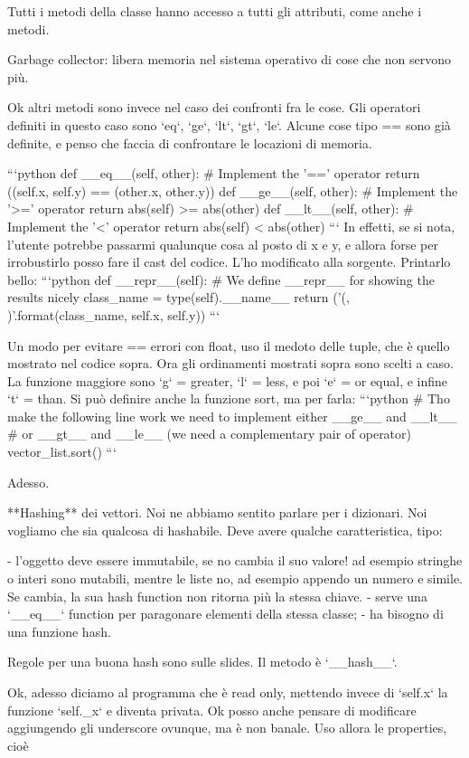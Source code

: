 \documentclass[10pt, a4paper, twosided, titlepage, draft]{book}
\begin{document}
Tutti i metodi della classe hanno accesso a tutti gli attributi, come anche i metodi.

Garbage collector: libera memoria nel sistema operativo di cose che non servono più.

Ok altri metodi sono invece nel caso dei confronti fra le cose.
Gli operatori definiti in questo caso sono `eq`, `ge`, `lt`, `gt`, `le`. Alcune cose tipo == sono già definite, e penso che faccia di confrontare le locazioni di memoria.

```python
def __eq__(self, other):
# Implement the ’==’ operator
return ((self.x, self.y) == (other.x, other.y))
def __ge__(self, other):
# Implement the ’>=’ operator
return abs(self) >= abs(other)
def __lt__(self, other):
# Implement the ’<’ operator
return abs(self) < abs(other)
```
In effetti, se si nota, l'utente potrebbe passarmi qualunque cosa al posto di x e y, e allora forse per irrobustirlo posso fare il cast del codice. L'ho modificato alla sorgente.
Printarlo bello:
```python
def __repr__(self):
# We define __repr__ for showing the results nicely
class_name = type(self).__name__
return (’{}({}, {})’.format(class_name, self.x, self.y))
```

Un modo per evitare == errori con float, uso il medoto delle tuple, che è quello mostrato nel codice sopra.
Ora gli ordinamenti mostrati sopra sono scelti a caso.
La funzione maggiore sono `g` = greater, `l` = less, e poi `e` = or equal, e infine `t` = than.
Si può definire anche la funzione sort, ma per farla:
```python
# Tho make the following line work we need to implement either __ge__ and __lt__
# or __gt__ and __le__ (we need a complementary pair of operator)
vector_list.sort()
```

Adesso.

**Hashing** dei vettori. Noi ne abbiamo sentito parlare per i dizionari. Noi vogliamo che sia qualcosa di hashabile.
Deve avere qualche caratteristica, tipo:

- l'oggetto deve essere immutabile, se no cambia il suo valore! ad esempio stringhe o interi sono mutabili, mentre le liste no, ad esempio appendo un numero e simile. Se cambia, la sua hash function non ritorna più la stessa chiave.
- serve una `__eq__` function per paragonare elementi della stessa classe;
- ha bisogno di una funzione hash.

Regole per una buona hash sono sulle slides. Il metodo è `__hash__`.

Ok, adesso diciamo al programma che è read only, mettendo invece di `self.x` la funzione `self._x` e diventa privata. Ok posso anche pensare di modificare aggiungendo gli underscore ovunque, ma è non banale. 
Uso allora le properties, cioè
\end{document}
